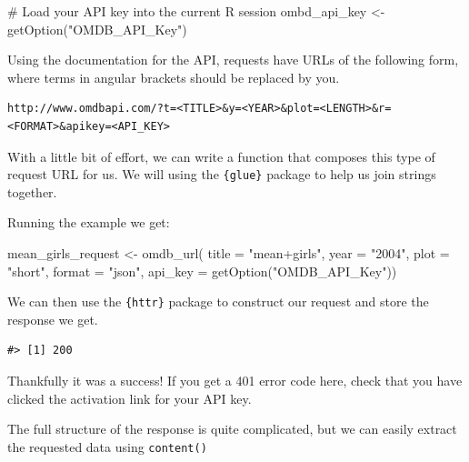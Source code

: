\documentclass[
  letterpaper,
  DIV=11,
  numbers=noendperiod]{scrreprt}
\newenvironment{Shaded}{\begin{snugshade}}{\end{snugshade}}
\newcommand{\AttributeTok}[1]{\textcolor[rgb]{0.40,0.45,0.13}{#1}}
\newcommand{\CommentTok}[1]{\textcolor[rgb]{0.37,0.37,0.37}{#1}}
\newcommand{\FunctionTok}[1]{\textcolor[rgb]{0.28,0.35,0.67}{#1}}
\newcommand{\NormalTok}[1]{\textcolor[rgb]{0.00,0.23,0.31}{#1}}
\newcommand{\OtherTok}[1]{\textcolor[rgb]{0.00,0.23,0.31}{#1}}
\newcommand{\StringTok}[1]{\textcolor[rgb]{0.13,0.47,0.30}{#1}}
\begin{document}
\begin{Shaded}
\begin{Highlighting}[]
\CommentTok{\# Load your API key into the current R session}
\NormalTok{ombd\_api\_key }\OtherTok{\textless{}{-}} \FunctionTok{getOption}\NormalTok{(}\StringTok{"OMDB\_API\_Key"}\NormalTok{)}
\end{Highlighting}
\end{Shaded}

Using the documentation for the API, requests have URLs of the following
form, where terms in angular brackets should be replaced by you.

\begin{verbatim}
http://www.omdbapi.com/?t=<TITLE>&y=<YEAR>&plot=<LENGTH>&r=<FORMAT>&apikey=<API_KEY>
\end{verbatim}

With a little bit of effort, we can write a function that composes this
type of request URL for us. We will using the \texttt{\{glue\}} package
to help us join strings together.

Running the example we get:

\begin{Shaded}
\begin{Highlighting}[]
\NormalTok{mean\_girls\_request }\OtherTok{\textless{}{-}} \FunctionTok{omdb\_url}\NormalTok{(}
  \AttributeTok{title =} \StringTok{"mean+girls"}\NormalTok{,}
  \AttributeTok{year =}  \StringTok{"2004"}\NormalTok{,}
  \AttributeTok{plot =} \StringTok{"short"}\NormalTok{,}
  \AttributeTok{format =}  \StringTok{"json"}\NormalTok{,}
  \AttributeTok{api\_key =}  \FunctionTok{getOption}\NormalTok{(}\StringTok{"OMDB\_API\_Key"}\NormalTok{))}
\end{Highlighting}
\end{Shaded}

We can then use the \texttt{\{httr\}} package to construct our request
and store the response we get.

\begin{verbatim}
#> [1] 200
\end{verbatim}

Thankfully it was a success! If you get a 401 error code here, check
that you have clicked the activation link for your API key.

The full structure of the response is quite complicated, but we can
easily extract the requested data using \texttt{content()}
\end{document}
